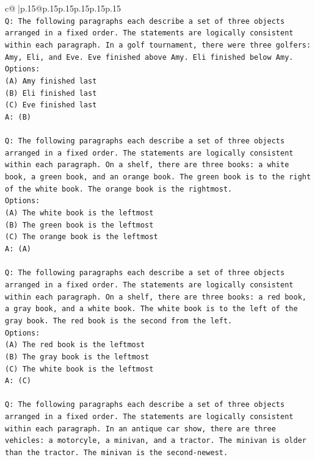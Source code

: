 \documentclass{article}
\begin{document}
{\begin{supertabular}{c@{$\;$}|p{.15\linewidth}@{}p{.15\linewidth}p{.15\linewidth}p{.15\linewidth}p{.15\linewidth}p{.15\linewidth}}
{{{\\ 
\texttt{Q: The following paragraphs each describe a set of three objects arranged in a fixed order. The statements are logically consistent within each paragraph. In a golf tournament, there were three golfers: Amy, Eli, and Eve. Eve finished above Amy. Eli finished below Amy.} \\
\texttt{Options:} \\
\texttt{(A) Amy finished last} \\
\texttt{(B) Eli finished last} \\
\texttt{(C) Eve finished last} \\
\texttt{A: (B)} \\
\\ 
\texttt{Q: The following paragraphs each describe a set of three objects arranged in a fixed order. The statements are logically consistent within each paragraph. On a shelf, there are three books: a white book, a green book, and an orange book. The green book is to the right of the white book. The orange book is the rightmost.} \\
\texttt{Options:} \\
\texttt{(A) The white book is the leftmost} \\
\texttt{(B) The green book is the leftmost} \\
\texttt{(C) The orange book is the leftmost} \\
\texttt{A: (A)} \\
\\ 
\texttt{Q: The following paragraphs each describe a set of three objects arranged in a fixed order. The statements are logically consistent within each paragraph. On a shelf, there are three books: a red book, a gray book, and a white book. The white book is to the left of the gray book. The red book is the second from the left.} \\
\texttt{Options:} \\
\texttt{(A) The red book is the leftmost} \\
\texttt{(B) The gray book is the leftmost} \\
\texttt{(C) The white book is the leftmost} \\
\texttt{A: (C)} \\
\\ 
\texttt{Q: The following paragraphs each describe a set of three objects arranged in a fixed order. The statements are logically consistent within each paragraph. In an antique car show, there are three vehicles: a motorcyle, a minivan, and a tractor. The minivan is older than the tractor. The minivan is the second{-}newest.} \\
}}}
\end{supertabular}}
\end{document}
